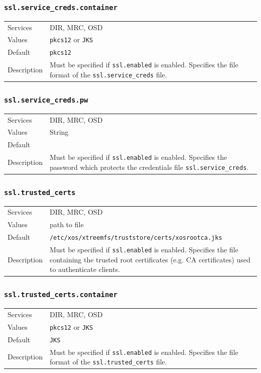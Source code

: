 \documentclass[a4paper,10pt]{book}
\begin{document}
\subsubsection{\texttt{ssl.service\_creds.container}}
\begin{tabular}{lp{10cm}}
 Services & DIR, MRC, OSD\\
 Values   & \texttt{pkcs12} or \texttt{JKS}\\
 Default  & \texttt{pkcs12}\\
 Description & Must be specified if \texttt{ssl.enabled} is enabled. Specifies the file format of the \texttt{ssl.service\_creds} file.
\end{tabular}

\subsubsection{\texttt{ssl.service\_creds.pw}}
\begin{tabular}{lp{10cm}}
 Services & DIR, MRC, OSD\\
 Values   & String\\
 Default  & \\
 Description & Must be specified if \texttt{ssl.enabled} is enabled. Specifies the password which protects the credentials file \texttt{ssl.service\_creds}.
\end{tabular}

\subsubsection{\texttt{ssl.trusted\_certs}}
\begin{tabular}{lp{10cm}}
 Services & DIR, MRC, OSD\\
 Values   & path to file\\
 Default  & \texttt{/etc/xos/xtreemfs/truststore/certs/xosrootca.jks}\\
 Description & Must be specified if \texttt{ssl.enabled} is enabled. Specifies the file containing the trusted root certificates (e.g. CA certificates) used to authenticate clients.
\end{tabular}

\subsubsection{\texttt{ssl.trusted\_certs.container}}
\begin{tabular}{lp{10cm}}
 Services & DIR, MRC, OSD\\
 Values   & \texttt{pkcs12} or \texttt{JKS}\\
 Default  & \texttt{JKS}\\
 Description & Must be specified if \texttt{ssl.enabled} is enabled. Specifies the file format of the \texttt{ssl.trusted\_certs} file.
\end{tabular}
\end{document}
